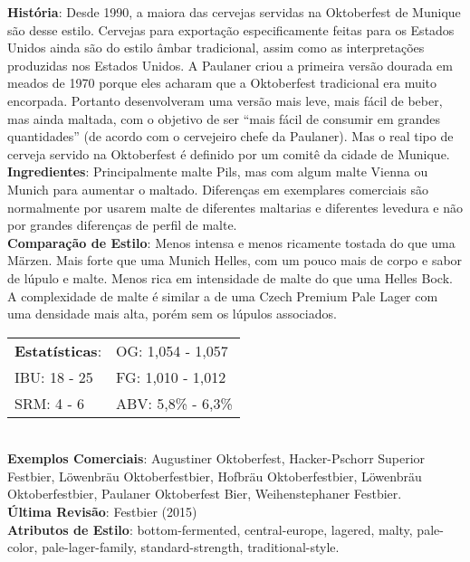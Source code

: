 \textbf{História}: Desde 1990, a maiora das cervejas servidas na Oktoberfest de Munique são desse estilo. Cervejas para exportação especificamente feitas para os Estados Unidos ainda são do estilo âmbar tradicional, assim como as interpretações produzidas nos Estados Unidos. A Paulaner criou a primeira versão dourada em meados de 1970 porque eles acharam que a Oktoberfest tradicional era muito encorpada. Portanto desenvolveram uma versão mais leve, mais fácil de beber, mas ainda maltada, com o objetivo de ser “mais fácil de consumir em grandes quantidades” (de acordo com o cervejeiro chefe da Paulaner). Mas o real tipo de cerveja servido na Oktoberfest é definido por um comitê da cidade de Munique. \\
\textbf{Ingredientes}: Principalmente malte Pils, mas com algum malte Vienna ou Munich para aumentar o maltado. Diferenças em exemplares comerciais são normalmente por usarem malte de diferentes maltarias e diferentes levedura e não por grandes diferenças de perfil de malte. \\
\textbf{Comparação de Estilo}: Menos intensa e menos ricamente tostada do que uma Märzen. Mais forte que uma Munich Helles, com um pouco mais de corpo e sabor de lúpulo e malte. Menos rica em intensidade de malte do que uma Helles Bock. A complexidade de malte é similar a de uma Czech Premium Pale Lager com uma densidade mais alta, porém sem os lúpulos associados. \\
\begin{tabular}{@{}p{35mm}p{35mm}@{}}
  \textbf{Estatísticas}: & OG: 1,054 - 1,057 \\
  IBU: 18 - 25  & FG: 1,010 - 1,012  \\
  SRM: 4 - 6   & ABV: 5,8\% - 6,3\%
\end{tabular}\\
\textbf{Exemplos Comerciais}: Augustiner Oktoberfest, Hacker-Pschorr Superior Festbier, Löwenbräu Oktoberfestbier, Hofbräu Oktoberfestbier, Löwenbräu Oktoberfestbier, Paulaner Oktoberfest Bier, Weihenstephaner Festbier. \\
\textbf{Última Revisão}: Festbier (2015) \\
\textbf{Atributos de Estilo}: bottom-fermented, central-europe, lagered, malty, pale-color, pale-lager-family, standard-strength, traditional-style.